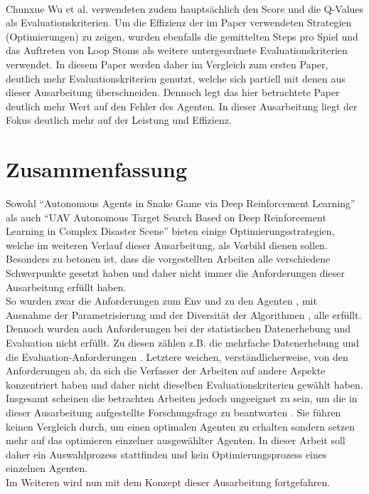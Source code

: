 \\Chunxue Wu et al. verwendeten zudem hauptsächlich den Score und die Q-Values als Evaluationskriterien. Um die Effizienz der im Paper verwendeten Strategien (Optimierungen) zu zeigen, wurden ebenfalls die gemittelten Steps pro Spiel und das Auftreten von Loop Stoms als weitere untergeordnete Evaluationskriterien verwendet. In diesem Paper werden daher im Vergleich zum ersten Paper, deutlich mehr Evaluationskriterien genutzt, welche sich partiell mit denen aus dieser Ausarbeitung überschneiden. Dennoch legt das hier betrachtete Paper deutlich mehr Wert auf den Fehler des Agenten. In dieser Ausarbeitung liegt der Fokus deutlich mehr auf der Leistung und Effizienz.


\section{Zusammenfassung} \label{sec:Verwandte_Arbeiten_Zusammenfassung}
Sowohl "`Autonomous Agents in Snake Game via Deep Reinforcement Learning"'  als auch "`UAV Autonomous Target Search Based on Deep Reinforcement Learning in Complex Disaster Scene"'  bieten einige Optimierungsstrategien, welche im weiteren Verlauf dieser Ausarbeitung, als Vorbild dienen sollen.\\
Besonders zu betonen ist, dass die vorgestellten Arbeiten alle verschiedene Schwerpunkte gesetzt haben und daher nicht immer die Anforderungen dieser Ausarbeitung erfüllt haben.\\ 
So wurden zwar die Anforderungen zum Env  und zu den Agenten , mit Ausnahme der Parametrisierung  und der Diversität der Algorithmen , alle erfüllt. Dennoch wurden auch Anforderungen bei der statistischen Datenerhebung und Evaluation nicht erfüllt. Zu diesen zählen z.B. die mehrfache Datenerhebung  und die Evaluation-Anforderungen . Letztere weichen, verständlicherweise, von den Anforderungen ab, da sich die Verfasser der Arbeiten auf andere Aspekte konzentriert haben und daher nicht dieselben Evaluationskriterien gewählt haben.\\
Insgesamt scheinen die betrachten Arbeiten jedoch ungeeignet zu sein, um die in dieser Ausarbeitung aufgestellte Forschungsfrage zu beantworten . Sie führen keinen Vergleich durch, um einen optimalen Agenten zu erhalten sondern setzen mehr auf das optimieren einzelner ausgewählter Agenten. In dieser Arbeit soll daher ein Auswahlprozess stattfinden und kein Optimierungsprozess eines einzelnen Agenten.\\
Im Weiteren wird nun mit dem Konzept dieser Ausarbeitung fortgefahren.